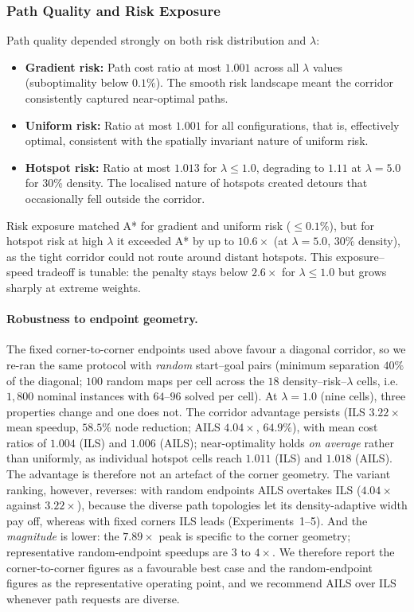 \documentclass[preprint,12pt,authoryear]{elsarticle}
\begin{document}
\subsubsection{Path Quality and Risk Exposure}

Path quality depended strongly on both risk distribution and $\lambda$:

\begin{itemize}
\item \textbf{Gradient risk:} Path cost ratio at most $1.001$ across all $\lambda$ values (suboptimality below $0.1\%$). The smooth risk landscape meant the corridor consistently captured near-optimal paths.
\item \textbf{Uniform risk:} Ratio at most $1.001$ for all configurations, that is, effectively optimal, consistent with the spatially invariant nature of uniform risk.
\item \textbf{Hotspot risk:} Ratio at most $1.013$ for $\lambda \leq 1.0$, degrading to $1.11$ at $\lambda = 5.0$ for 30\% density. The localised nature of hotspots created detours that occasionally fell outside the corridor.
\end{itemize}

Risk exposure matched A* for gradient and uniform risk ($\leq 0.1\%$), but for hotspot risk at high $\lambda$ it exceeded A* by up to $10.6\times$ (at $\lambda = 5.0$, 30\% density), as the tight corridor could not route around distant hotspots. This exposure--speed tradeoff is tunable: the penalty stays below $2.6\times$ for $\lambda \leq 1.0$ but grows sharply at extreme weights.

\paragraph{Robustness to endpoint geometry.}
The fixed corner-to-corner endpoints used above favour a diagonal corridor, so we re-ran the same protocol with \emph{random} start--goal pairs (minimum separation $40\%$ of the diagonal; $100$ random maps per cell across the $18$ density--risk--$\lambda$ cells, i.e.\ $1{,}800$ nominal instances with $64$--$96$ solved per cell). At $\lambda = 1.0$ (nine cells), three properties change and one does not. The corridor advantage persists (ILS $3.22\times$ mean speedup, $58.5\%$ node reduction; AILS $4.04\times$, $64.9\%$), with mean cost ratios of $1.004$ (ILS) and $1.006$ (AILS); near-optimality holds \emph{on average} rather than uniformly, as individual hotspot cells reach $1.011$ (ILS) and $1.018$ (AILS). The advantage is therefore not an artefact of the corner geometry. The variant ranking, however, reverses: with random endpoints AILS overtakes ILS ($4.04\times$ against $3.22\times$), because the diverse path topologies let its density-adaptive width pay off, whereas with fixed corners ILS leads (Experiments~1--5). And the \emph{magnitude} is lower: the $7.89\times$ peak is specific to the corner geometry; representative random-endpoint speedups are $3$ to $4\times$. We therefore report the corner-to-corner figures as a favourable best case and the random-endpoint figures as the representative operating point, and we recommend AILS over ILS whenever path requests are diverse.
\end{document}

